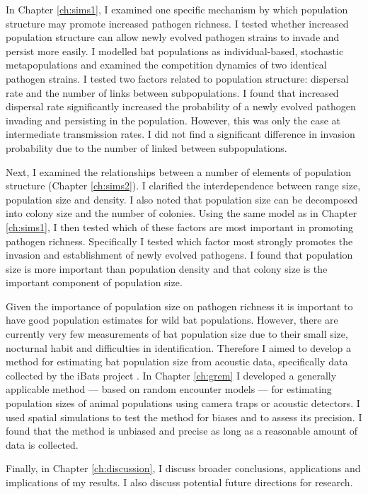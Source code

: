 
In Chapter \ref{ch:sims1}, I examined one specific mechanism by which population structure may promote increased pathogen richness.
I tested whether increased population structure can allow newly evolved pathogen strains to invade and persist more easily.
I modelled bat populations as individual-based, stochastic metapopulations and examined the competition dynamics of two identical pathogen strains.
I tested two factors related to population structure: dispersal rate and the number of links between subpopulations.
I found that increased dispersal rate significantly increased the probability of a newly evolved pathogen invading and persisting in the population.
However, this was only the case at intermediate transmission rates.
I did not find a significant difference in invasion probability due to the number of linked between subpopulations.


Next, I examined the relationships between a number of elements of population structure (Chapter \ref{ch:sims2}).
I clarified the interdependence between range size, population size and density.
I also noted that population size can be decomposed into colony size and the number of colonies.
Using the same model as in Chapter \ref{ch:sims1}, I then tested which of these factors are most important in promoting pathogen richness.
Specifically I tested which factor most strongly promotes the invasion and establishment of newly evolved pathogens.
I found that population size is more important than population density and that colony size is the important component of population size.


Given the importance of population size on pathogen richness it is important to have good population estimates for wild bat populations.
However, there are currently very few measurements of bat population size due to their small size, nocturnal habit and difficulties in identification.
Therefore I aimed to develop a method for estimating bat population size from acoustic data, specifically data collected by the iBats project \cite{jones2011indicator}.
In Chapter \ref{ch:grem} I developed a generally applicable method --- based on random encounter models \cite{rowcliffe2008estimating, yapp1956theory} --- for estimating population sizes of animal populations using camera traps or acoustic detectors.
I used spatial simulations to test the method for biases and to assess its precision.
I found that the method is unbiased and precise as long as a reasonable amount of data is collected.



Finally, in Chapter \ref{ch:discussion}, I discuss broader conclusions, applications and implications of my results.
I also discuss potential future directions for research.












